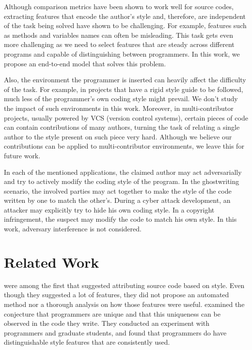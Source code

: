 Although comparison metrics have been shown to work well for source codes, extracting features that encode the author's style and, therefore, are independent of the task being solved have shown to be challenging. For example, features such as methods and variables names can often be misleading. This task gets even more challenging as we need to select features that are steady across different programs and capable of distinguishing between programmers. In this work, we propose an end-to-end model that solves this problem.

Also, the environment the programmer is inserted can heavily affect the difficulty of the task. For example, in projects that have a rigid style guide to be followed, much less of the programmer's own coding style might prevail. We don't study the impact of such environments in this work. Moreover, in multi-contributor projects, usually powered by VCS (version control systems), certain pieces of code can contain contributions of many authors, turning the task of relating a single author to the style present on such piece very hard. Although we believe our contributions can be applied to multi-contributor environments, we leave this for future work.

In each of the mentioned applications, the claimed author may act adversarially and try to actively modify the coding style of the program. In the ghostwriting scenario, the involved parties may act together to make the style of the code written by one to match the other's. During a cyber attack development, an attacker may explicitly try to hide his own coding style. In a copyright infringement, the suspect may modify the code to match his own style. In this work, adversary interference is not considered.

\section{Related Work}

 were among the first that suggested attributing source code based on style. Even though they suggested a lot of features, they did not propose an automated method nor a thorough analysis on how those features were useful.  examined the conjecture that programmers are unique and that this uniqueness can be observed in the code they write. They conducted an experiment with programmers and graduate students, and found that programmers do have distinguishable style features that are consistently used.


